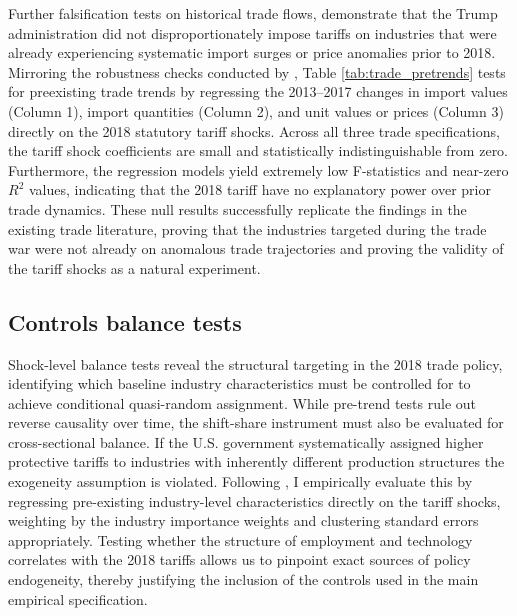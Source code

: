 \documentclass[12pt]{article}
\numberwithin{figure}{section}
\numberwithin{table}{section}
\begin{document}
Further falsification tests on historical trade flows, demonstrate that the Trump administration did not disproportionately impose tariffs on industries that were already experiencing systematic import surges or price anomalies prior to 2018. Mirroring the robustness checks conducted by \cite{Fajgelbaum2020}, Table \ref{tab:trade_pretrends} tests for preexisting trade trends by regressing the 2013–2017 changes in import values (Column 1), import quantities (Column 2), and unit values or prices (Column 3) directly on the 2018 statutory tariff shocks. Across all three trade specifications, the tariff shock coefficients are small and statistically indistinguishable from zero. Furthermore, the regression models yield extremely low F-statistics and near-zero $R^2$ values, indicating that the 2018 tariff have no explanatory power over prior trade dynamics. These null results successfully replicate the findings in the existing trade literature, proving that the industries targeted during the trade war were not already on anomalous trade trajectories and proving the validity of the tariff shocks as a natural experiment.




\newpage
\subsection{Controls balance tests}

Shock-level balance tests reveal the structural targeting in the 2018 trade policy, identifying which baseline industry characteristics must be controlled for to achieve conditional quasi-random assignment. While pre-trend tests rule out reverse causality over time, the shift-share instrument must also be evaluated for cross-sectional balance. If the U.S. government systematically assigned higher protective tariffs to industries with inherently different production structures the exogeneity assumption is violated. Following \cite{BHJ2022}, I empirically evaluate this by regressing pre-existing industry-level characteristics directly on the tariff shocks, weighting by the industry importance weights and clustering standard errors appropriately. Testing whether the structure of employment and technology correlates with the 2018 tariffs allows us to pinpoint exact sources of policy endogeneity, thereby justifying the inclusion of the controls used in the main empirical specification.
\end{document}
